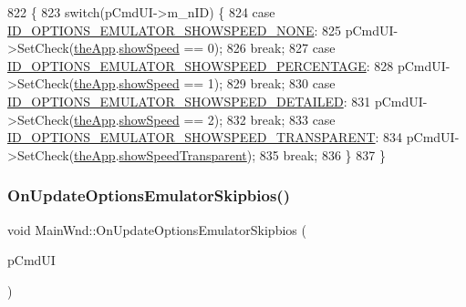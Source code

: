 \begin{DoxyCode}
822 \{
823   \textcolor{keywordflow}{switch}(pCmdUI->m\_nID) \{
824   \textcolor{keywordflow}{case} \mbox{\hyperlink{resource_8h_a451fc737b7bded73e0c88477770c6d9c}{ID\_OPTIONS\_EMULATOR\_SHOWSPEED\_NONE}}:
825     pCmdUI->SetCheck(\mbox{\hyperlink{_v_b_a_8cpp_a8095a9d06b37a7efe3723f3218ad8fb3}{theApp}}.\mbox{\hyperlink{class_v_b_a_ad86589d0d03fceef36d35c0b2e928e9e}{showSpeed}} == 0);
826     \textcolor{keywordflow}{break};
827   \textcolor{keywordflow}{case} \mbox{\hyperlink{resource_8h_a229afc2f5ae1609aea580e0dbd7f8293}{ID\_OPTIONS\_EMULATOR\_SHOWSPEED\_PERCENTAGE}}:
828     pCmdUI->SetCheck(\mbox{\hyperlink{_v_b_a_8cpp_a8095a9d06b37a7efe3723f3218ad8fb3}{theApp}}.\mbox{\hyperlink{class_v_b_a_ad86589d0d03fceef36d35c0b2e928e9e}{showSpeed}} == 1);
829     \textcolor{keywordflow}{break};
830   \textcolor{keywordflow}{case} \mbox{\hyperlink{resource_8h_abc01a85f7ca68082b809b0e166b00fdd}{ID\_OPTIONS\_EMULATOR\_SHOWSPEED\_DETAILED}}:
831     pCmdUI->SetCheck(\mbox{\hyperlink{_v_b_a_8cpp_a8095a9d06b37a7efe3723f3218ad8fb3}{theApp}}.\mbox{\hyperlink{class_v_b_a_ad86589d0d03fceef36d35c0b2e928e9e}{showSpeed}} == 2);
832     \textcolor{keywordflow}{break};
833   \textcolor{keywordflow}{case} \mbox{\hyperlink{resource_8h_ac4eb3ce376b2308402f4763f606b55df}{ID\_OPTIONS\_EMULATOR\_SHOWSPEED\_TRANSPARENT}}:
834     pCmdUI->SetCheck(\mbox{\hyperlink{_v_b_a_8cpp_a8095a9d06b37a7efe3723f3218ad8fb3}{theApp}}.\mbox{\hyperlink{class_v_b_a_a0a2ca5a7091f9c79b39ea0916dd88a05}{showSpeedTransparent}});
835     \textcolor{keywordflow}{break};
836   \}
837 \}
\end{DoxyCode}
\mbox{\label{class_main_wnd_a6808315740b4fa5adcd51384dff66b2a}} 
\subsubsection{\texorpdfstring{On\+Update\+Options\+Emulator\+Skipbios()}{OnUpdateOptionsEmulatorSkipbios()}}
{\footnotesize\ttfamily void Main\+Wnd\+::\+On\+Update\+Options\+Emulator\+Skipbios (\begin{DoxyParamCaption}\item[{C\+Cmd\+UI $\ast$}]{p\+Cmd\+UI }\end{DoxyParamCaption})\hspace{0.3cm}{\ttfamily [protected]}}



